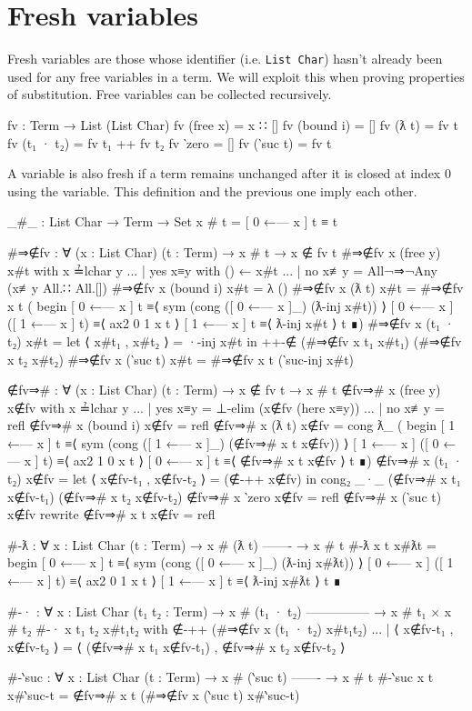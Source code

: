 \section{Fresh variables}
Fresh variables are those whose identifier (i.e. \texttt{List Char}) hasn't already been used for
any free variables in a term. We will exploit this when proving properties of substitution. Free
variables can be collected recursively.
\begin{code}
  fv : Term → List (List Char)
  fv (free x) = x ∷ []
  fv (bound i) = []
  fv (ƛ t) = fv t
  fv (t₁ · t₂) = fv t₁ ++ fv t₂
  fv ‵zero = []
  fv (‵suc t) = fv t
\end{code}

A variable is also fresh if a term remains unchanged after it is closed at index $0$ using the
variable. This definition and the previous one imply each other.
\begin{code}
  _#_ : List Char → Term → Set
  x # t = [ 0 ←— x ] t ≡ t

  #⇒∉fv : ∀ (x : List Char) (t : Term) → x # t → x ∉ fv t
  #⇒∉fv x (free y) x#t with x ≟lchar y
  ... | yes x≡y with () ← x#t
  ... | no  x≢y = All¬⇒¬Any (x≢y All.∷ All.[])
  #⇒∉fv x (bound i) x#t = λ ()
  #⇒∉fv x (ƛ t) x#t = #⇒∉fv x t (
    begin
      [ 0 ←— x ] t
    ≡⟨ sym (cong ([ 0 ←— x ]_) (ƛ-inj x#t)) ⟩
      [ 0 ←— x ] ([ 1 ←— x ] t)
    ≡⟨ ax2 0 1 x t ⟩
      [ 1 ←— x ] t
    ≡⟨ ƛ-inj x#t ⟩
      t
    ∎)
  #⇒∉fv x (t₁ · t₂) x#t = let ⟨ x#t₁ , x#t₂ ⟩ = ·-inj x#t in
    ++-∉
      (#⇒∉fv x t₁ x#t₁)
      (#⇒∉fv x t₂ x#t₂)
  #⇒∉fv x (‵suc t) x#t = #⇒∉fv x t (‵suc-inj x#t)

  ∉fv⇒# : ∀ (x : List Char) (t : Term) → x ∉ fv t → x # t
  ∉fv⇒# x (free y) x∉fv with x ≟lchar y
  ... | yes x≡y = ⊥-elim (x∉fv (here x≡y))
  ... | no  x≢y = refl
  ∉fv⇒# x (bound i) x∉fv = refl
  ∉fv⇒# x (ƛ t) x∉fv = cong ƛ_ (
    begin
      [ 1 ←— x ] t
    ≡⟨ sym (cong ([ 1 ←— x ]_) (∉fv⇒# x t x∉fv)) ⟩
      [ 1 ←— x ] ([ 0 ←— x ] t)
    ≡⟨ ax2 1 0 x t ⟩
      [ 0 ←— x ] t
    ≡⟨ ∉fv⇒# x t x∉fv ⟩
      t
    ∎)
  ∉fv⇒# x (t₁ · t₂) x∉fv =
    let ⟨ x∉fv-t₁ , x∉fv-t₂ ⟩ = (∉-++ x∉fv) in
      cong₂ _·_
        (∉fv⇒# x t₁ x∉fv-t₁)
        (∉fv⇒# x t₂ x∉fv-t₂)
  ∉fv⇒# x ‵zero x∉fv = refl
  ∉fv⇒# x (‵suc t) x∉fv rewrite ∉fv⇒# x t x∉fv = refl

  #-ƛ : ∀ {x : List Char} (t : Term)
    → x # (ƛ t)
      -------
    → x # t
  #-ƛ {x} t x#ƛt =
    begin
      [ 0 ←— x ] t
    ≡⟨ sym (cong ([ 0 ←— x ]_) (ƛ-inj x#ƛt)) ⟩
      [ 0 ←— x ] ([ 1 ←— x ] t)
    ≡⟨ ax2 0 1 x t ⟩
      [ 1 ←— x ] t
    ≡⟨ ƛ-inj x#ƛt ⟩
      t
    ∎

  #-· : ∀ {x : List Char} (t₁ t₂ : Term)
    → x # (t₁ · t₂)
      ---------------
    → x # t₁ × x # t₂
  #-· {x} t₁ t₂ x#t₁t₂ with ∉-++ (#⇒∉fv x (t₁ · t₂) x#t₁t₂)
  ... | ⟨ x∉fv-t₁ , x∉fv-t₂ ⟩
    = ⟨ (∉fv⇒# x t₁ x∉fv-t₁) , ∉fv⇒# x t₂ x∉fv-t₂ ⟩

  #-‵suc : ∀ {x : List Char} (t : Term)
    → x # (‵suc t)
      -------
    → x # t
  #-‵suc {x} t x#‵suc-t = ∉fv⇒# x t (#⇒∉fv x (‵suc t) x#‵suc-t)
\end{code}


